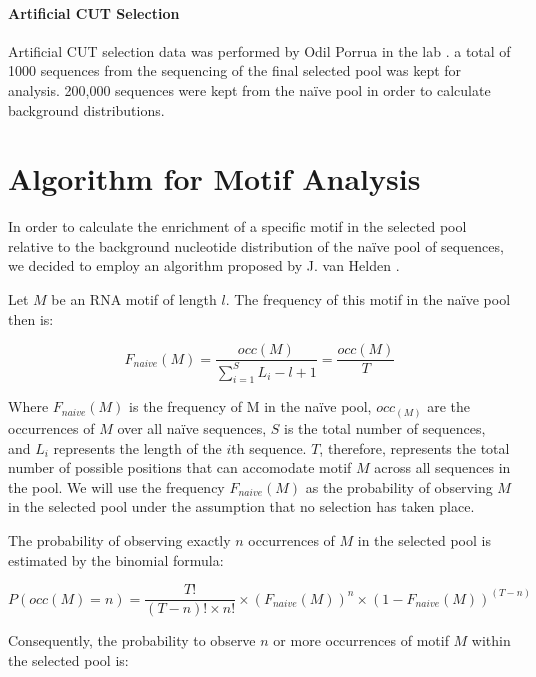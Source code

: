 \paragraph{Artificial CUT Selection}
Artificial CUT selection data was performed by Odil Porrua in the lab \cite{porrua:2012:in}.
a total of 1000 sequences from the sequencing of the final selected pool was kept for analysis.
200,000 sequences were kept from the na\"{i}ve pool in order to calculate background distributions.



\section*{Algorithm for Motif Analysis}

In order to calculate the enrichment of a specific motif in the selected pool relative to the background nucleotide distribution of the na\"{i}ve pool of sequences, we decided to employ an algorithm proposed by J. van Helden \cite{vanhelden:1998:extracting}. 
 
Let $M$ be an RNA motif of length $l$. The frequency of this motif in the na\"{i}ve pool then is:

\begin{equation} \label{feaf}
F_{naive}(M)  =\dfrac{occ(M)}{\sum_{i=1}^{S} L_i - l + 1} = \dfrac{occ(M)}{T}
\end{equation}

Where $F_{naive}(M)$ is the frequency of M in the na\"{i}ve pool, $occ_(M)$ are the occurrences of $M$ over all na\"{i}ve sequences, $S$ is the total number of  sequences, and $L_i$ represents the length of the $i$th sequence. $T$, therefore, represents the total number of possible positions that can accomodate motif $M$ across all sequences in the pool. We will use the frequency $F_{naive}(M)$ as the probability of observing $M$ in the selected pool under the assumption that no selection has taken place.


The probability of observing exactly $n$ occurrences of $M$ in the selected pool is estimated by the binomial formula:

\begin{equation}
P(occ(M)=n) = \dfrac{T!}{(T-n)! \times n!} \times (F_{naive}(M))^n \times (1-F_{naive}(M))^{(T-n)}
\end{equation}

Consequently, the probability to observe $n$ or more occurrences of motif $M$ within the selected pool is:

